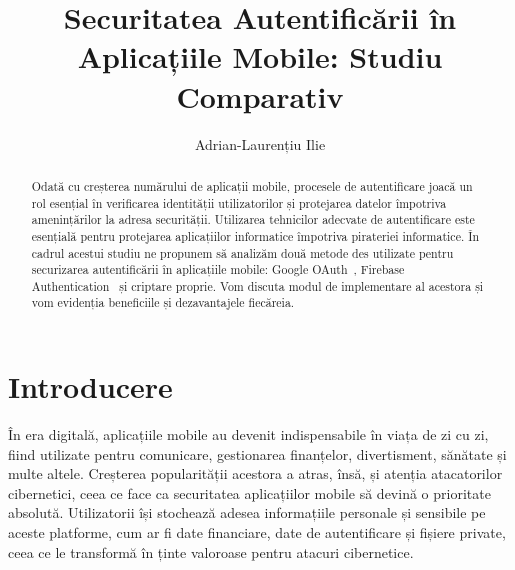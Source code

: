 \documentclass[runningheads]{llncs}
\begin{document}
%
\title{Securitatea Autentificării în Aplicațiile Mobile: Studiu Comparativ}
%
%
\author{Adrian-Laurențiu Ilie}
%
%
%
\maketitle              %
%
\begin{abstract}
Odată cu creșterea numărului de aplicații mobile, procesele de autentificare joacă un rol esențial în verificarea identității utilizatorilor și protejarea datelor împotriva amenințărilor la adresa securității. Utilizarea tehnicilor adecvate de autentificare este esențială pentru protejarea aplicațiilor informatice împotriva pirateriei informatice. În cadrul acestui studiu ne propunem să analizăm două metode des utilizate pentru securizarea autentificării în aplicațiile mobile: Google OAuth~\cite{googleoauth}, Firebase Authentication~\cite{firebaseauth} și criptare proprie. Vom discuta modul de implementare al acestora și vom evidenția beneficiile și dezavantajele fiecăreia.

\end{abstract}
%
%
%
\section{Introducere}
În era digitală, aplicațiile mobile au devenit indispensabile în viața de zi cu zi, fiind utilizate pentru comunicare, gestionarea finanțelor, divertisment, sănătate și multe altele. Creșterea popularității acestora a atras, însă, și atenția atacatorilor cibernetici, ceea ce face ca securitatea aplicațiilor mobile să devină o prioritate absolută. Utilizatorii își stochează adesea informațiile personale și sensibile pe aceste platforme, cum ar fi date financiare, date de autentificare și fișiere private, ceea ce le transformă în ținte valoroase pentru atacuri cibernetice.
\end{document}
